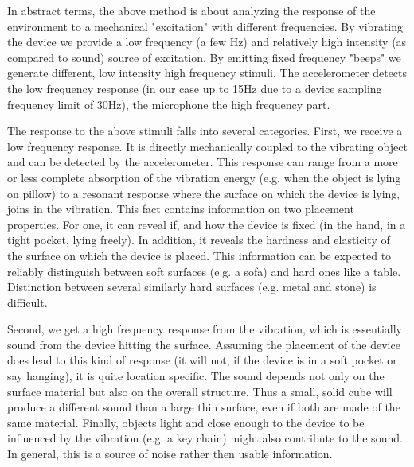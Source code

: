 
In abstract terms, the above method is about analyzing the response
of the environment to a mechanical "excitation" with different frequencies. 
By vibrating the device we provide a low frequency (a few Hz) and relatively high intensity (as
compared to sound) source of excitation. By emitting fixed frequency
"beeps" we generate different, low intensity high frequency stimuli.  
The accelerometer detects the low frequency response (in our case up
to 15Hz due to a device sampling frequency limit of 30Hz),
the microphone the high frequency part. 

The response to the above stimuli falls into several categories. 
First, we receive a low frequency response. 
It is directly mechanically coupled to the vibrating object and can be detected
by the accelerometer. This response can range from a more or less
complete absorption of the vibration energy (e.g. when the object is
lying on pillow) to a resonant response where the 
surface on which the device is lying, joins in the vibration.
This fact contains information on two placement properties. For one, it can reveal if, and how
the device is fixed (in the hand, in a tight pocket, lying freely). In
addition, it reveals the hardness and elasticity of the surface on which the
device is placed. This information can be expected to reliably distinguish
between soft surfaces (e.g. a sofa) and hard ones like a
table. Distinction between several similarly hard surfaces (e.g. metal
and stone) is difficult.

Second, we get a high frequency response from the vibration, 
which is essentially sound from the device hitting the
surface. Assuming the placement of the device does lead to this kind
of response (it will not, if the device is in a soft pocket or say hanging),
it is quite location specific. The sound depends not only on the
surface material but also on the overall structure. 
Thus a small, solid cube will produce a different sound
than a large thin surface, even if both are made of the same
material. Finally, objects light and close enough to the device to
be influenced by the vibration (e.g. a key chain) might also
contribute to the sound. In general, this is a source of noise rather
then usable information. 


